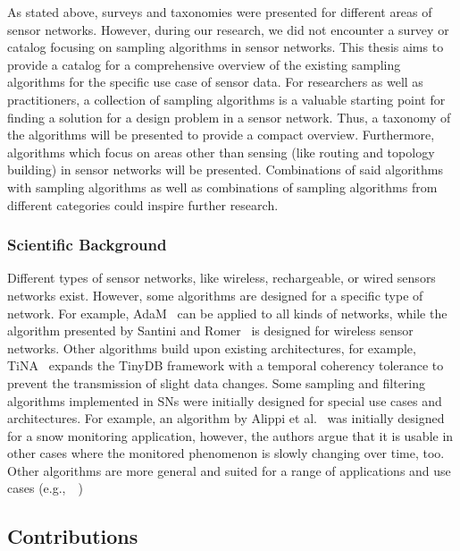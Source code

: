 As stated above, surveys and taxonomies were presented for different areas of sensor networks. However, during our research, we did not encounter a survey or catalog focusing on sampling algorithms in sensor networks. This thesis aims to provide a catalog for a comprehensive overview of the existing sampling algorithms for the specific use case of sensor data. For researchers as well as practitioners, a collection of sampling algorithms is a valuable starting point for finding a solution for a design problem in a sensor network. Thus, a taxonomy of the algorithms will be presented to provide a compact overview. Furthermore, algorithms which focus on areas other than sensing (like routing and topology building) in sensor networks will be presented. Combinations of said algorithms with sampling algorithms as well as combinations of sampling algorithms from different categories could inspire further research.

\subsubsection{Scientific Background}
\label{sec:Scientific Background}

Different types of sensor networks, like wireless, rechargeable, or wired sensors networks exist. 
However, some algorithms are designed for a specific type of network. For example, AdaM~\cite{trihinas2015adam} can be applied to all kinds of networks, while the algorithm presented by Santini and Romer~\cite{santini2006adaptive} is designed for wireless sensor networks. Other algorithms build upon existing architectures, for example, TiNA~\cite{sharaf2003tina} expands the TinyDB framework with a temporal coherency tolerance to prevent the transmission of slight data changes. Some sampling and filtering algorithms implemented in SNs were initially designed for special use cases and architectures. For example, an algorithm by Alippi et al.~\cite{alippi2010adaptive} was initially designed for a snow monitoring application, however, the authors argue that it is usable in other cases where the monitored phenomenon is slowly changing over time, too. Other algorithms are more general and suited for a range of applications and use cases (e.g.,~\cite{fan2013fast}~\cite{gaura2013edge})


\clearpage
\subsection{Contributions}
\label{sec:contributions}

